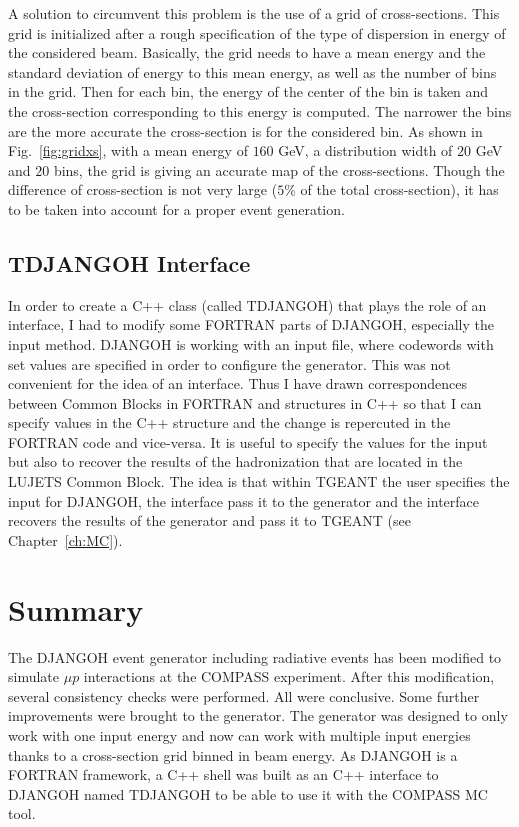 A solution to circumvent this problem is the use of a grid of cross-sections. This grid is initialized after a rough specification of the type of dispersion in energy of the considered beam. Basically, the grid needs to have a mean energy and the standard deviation of energy to this mean energy, as well as the number of bins in the grid. Then for each bin, the energy of the center of the bin is taken and the cross-section corresponding to this energy is computed. The narrower the bins are the more accurate the cross-section is for the considered bin. As shown in Fig.~\ref{fig:gridxs}, with a mean energy of $160$ GeV, a distribution width of $20$ GeV and $20$ bins, the grid is giving an accurate map of the cross-sections. Though the difference of cross-section is not very large ($5$\% of the total cross-section), it has to be taken into account for a proper event generation.

\subsection{TDJANGOH Interface}

In order to create a C++ class (called TDJANGOH) that plays the role of an interface, I had to modify some FORTRAN parts of DJANGOH, especially the input method. DJANGOH is working with an input file, where codewords with set values are specified in order to configure the generator. This was not convenient for the idea of an interface. Thus I have drawn correspondences between Common Blocks in FORTRAN and structures in C++ so that I can specify values in the C++ structure and the change is repercuted in the FORTRAN code and vice-versa. It is useful to specify the values for the input but also to recover the results of the hadronization that are located in the LUJETS Common Block. The idea is that within TGEANT the user specifies the input for DJANGOH, the interface pass it to the generator and the interface recovers the results of the generator and pass it to TGEANT (see Chapter~\ref{ch:MC}).


\section{Summary}

The DJANGOH event generator including radiative events has been modified to simulate $\mu p$ interactions at the COMPASS experiment. After this modification, several consistency checks were performed. All were conclusive. Some further improvements were brought to the generator. The generator was designed to only work with one input energy and now can work with multiple input energies thanks to a cross-section grid binned in beam energy. As DJANGOH is a FORTRAN framework, a C++ shell was built as an C++ interface to DJANGOH named TDJANGOH to be able to use it with the COMPASS MC tool.
